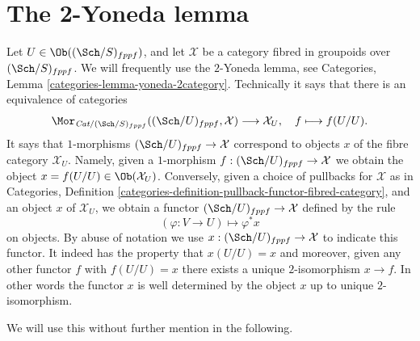 \section{The 2-Yoneda lemma}
\label{algebraic-section-2-yoneda}
Let $U \in \Ob((\Sch/S)_{fppf})$, and let $\mathcal{X}$ be a
category fibred in groupoids over $(\Sch/S)_{fppf}$.
We will frequently use the $2$-Yoneda lemma, see
Categories, Lemma \ref{categories-lemma-yoneda-2category}.
Technically it says that there is an equivalence of categories
$$
\Mor_{\textit{Cat}/(\Sch/S)_{fppf}}(
(\Sch/U)_{fppf}, \mathcal{X})
\longrightarrow
\mathcal{X}_U, \quad
f \longmapsto f(U/U).
$$
It says that $1$-morphisms $(\Sch/U)_{fppf} \to \mathcal{X}$
correspond to objects $x$ of the fibre category $\mathcal{X}_U$.
Namely, given a $1$-morphism $f : (\Sch/U)_{fppf} \to \mathcal{X}$
we obtain the object $x = f(U/U) \in \Ob(\mathcal{X}_U)$.
Conversely, given a choice of pullbacks for $\mathcal{X}$ as in
Categories,
Definition \ref{categories-definition-pullback-functor-fibred-category},
and an object $x$ of $\mathcal{X}_U$, we obtain a functor
$(\Sch/U)_{fppf} \to \mathcal{X}$ defined by the rule
$$
(\varphi : V \to U) \longmapsto \varphi^*x
$$
on objects. By abuse of notation we use
$x : (\Sch/U)_{fppf} \to \mathcal{X}$
to indicate this functor. It indeed has the property that $x(U/U) = x$
and moreover, given any other functor $f$ with $f(U/U) = x$ there exists
a unique $2$-isomorphism $x \to f$. In other words the functor $x$
is well determined by the object $x$ up to unique $2$-isomorphism.

\medskip\noindent
We will use this without further mention in the following.

